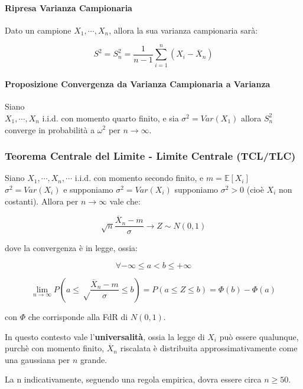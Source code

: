 \documentclass{article}
\begin{document}
\paragraph{Ripresa Varianza Campionaria} Dato un campione $X_{1}, \cdots, X_{n}$, allora la sua varianza campionaria sarà:

\[ S^{2} = S^{2}_{n} = \frac{1}{n-1} \sum_{i=1}^{n} (X_{i} - \overline{X}_{n}) \]

\paragraph{Proposizione Convergenza da Varianza Campionaria a Varianza} Siano \\ $X_{1}, \cdots, X_{n}$ i.i.d. con momento quarto finito, e sia $\sigma^{2} = Var(X_{1})$ allora
$S^{2}_{n}$ converge in probabilità a $\omega^{2}$ per $n \rightarrow \infty$.

\subsubsection{Teorema Centrale del Limite - Limite Centrale (TCL/TLC)}

Siano $X_{1}, \cdots, X_{n}, \cdots$ i.i.d. con momento secondo finito, e $m = \mathbb{E}[X_{i}]$ $\sigma^{2} = Var(X_{i})$ e supponiamo $\sigma^{2} = Var(X_{i})$ supponiamo
$\sigma^{2} > 0$ (cioè $X_{i}$ non costanti). Allora per $n \rightarrow \infty$ vale che:

\[ \sqrt{n} \frac{\overline{X}_{n} - m}{\sigma} \rightarrow Z \sim N(0,1) \]

dove la convergenza è in legge, ossia:

\[ \forall - \infty \leq a < b \leq + \infty \]

\[ \lim_{n \rightarrow \infty} P( a \leq \sqrt \frac{\overline{X}_{n} - m}{\sigma} \leq b ) = P(a \leq Z \leq b) = \Phi(b) - \Phi(a)  \]

con $\Phi$ che corrisponde alla FdR di $N(0,1)$.

\vspace*{10px}

In questo contesto vale l'\textbf{universalità}, ossia la legge di $X_{i}$ può essere qualunque, purchè con momento finito, $\overline{X}_{n}$ riscalata è distribuita approssimativamente come una
gaussiana per $n$ grande.

La n indicativamente, seguendo una regola empirica, dovra essere circa $n \geq 50$.

\newpage
\end{document}

